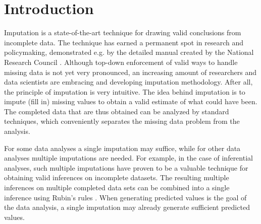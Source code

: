 \documentclass[bimj,fleqn]{w-art}
\begin{document}
\maketitle          %







\section{Introduction}

Imputation is a state-of-the-art technique for drawing valid conclusions from incomplete data. The technique has earned a permanent spot in research and policymaking, demonstrated e.g. by the detailed manual created by the National Research Council \citep*{little2012prevention}. Although top-down enforcement of valid ways to handle missing data is not yet very pronounced, an increasing amount of researchers and data scientists are embracing and developing imputation methodology. After all, the principle of imputation is very intuitive. The idea behind imputation is to impute (fill in) missing values to obtain a valid estimate of what could have been. The completed data that are thus obtained can be analyzed by standard techniques, which conveniently separates the missing data problem from the analysis. 

For some data analyses a single imputation may suffice, while for other data analyses multiple imputations are needed. For example, in the case of inferential analyses, such multiple imputations \citep{rubi76} have proven to be a valuable technique for obtaining valid inferences on incomplete datasets. The resulting multiple inferences on multiple completed data sets can be combined into a single inference using Rubin's rules \citep[][p. 76]{rubi87}. When generating predicted values is the goal of the data analysis, a single imputation may already generate sufficient \citep{nijm20} predicted values. 
\end{document}

